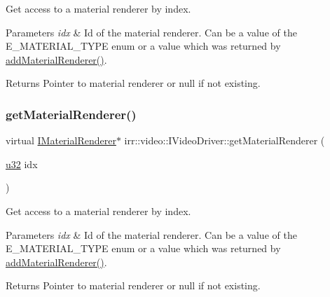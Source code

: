 Get access to a material renderer by index. 


\begin{DoxyParams}{Parameters}
{\em idx} & Id of the material renderer. Can be a value of the E\+\_\+\+M\+A\+T\+E\+R\+I\+A\+L\+\_\+\+T\+Y\+PE enum or a value which was returned by \hyperlink{classirr_1_1video_1_1IVideoDriver_a0dfc3a7168f3a73a6f4323b579f03ff6}{add\+Material\+Renderer()}. \\
\hline
\end{DoxyParams}
\begin{DoxyReturn}{Returns}
Pointer to material renderer or null if not existing. 
\end{DoxyReturn}
\mbox{\label{classirr_1_1video_1_1IVideoDriver_accb321dfb32ad3c76efb99427bc90cc8}} 
\subsubsection{\texorpdfstring{get\+Material\+Renderer()}{getMaterialRenderer()}\hspace{0.1cm}{\footnotesize\ttfamily [2/2]}}
{\footnotesize\ttfamily virtual \hyperlink{classirr_1_1video_1_1IMaterialRenderer}{I\+Material\+Renderer}$\ast$ irr\+::video\+::\+I\+Video\+Driver\+::get\+Material\+Renderer (\begin{DoxyParamCaption}\item[{\hyperlink{namespaceirr_a0416a53257075833e7002efd0a18e804}{u32}}]{idx }\end{DoxyParamCaption})\hspace{0.3cm}{\ttfamily [pure virtual]}}



Get access to a material renderer by index. 


\begin{DoxyParams}{Parameters}
{\em idx} & Id of the material renderer. Can be a value of the E\+\_\+\+M\+A\+T\+E\+R\+I\+A\+L\+\_\+\+T\+Y\+PE enum or a value which was returned by \hyperlink{classirr_1_1video_1_1IVideoDriver_a0dfc3a7168f3a73a6f4323b579f03ff6}{add\+Material\+Renderer()}. \\
\hline
\end{DoxyParams}
\begin{DoxyReturn}{Returns}
Pointer to material renderer or null if not existing. 
\end{DoxyReturn}
\mbox{\label{classirr_1_1video_1_1IVideoDriver_ac1d0e2e952afdcdbdd915dc106375381}} 
